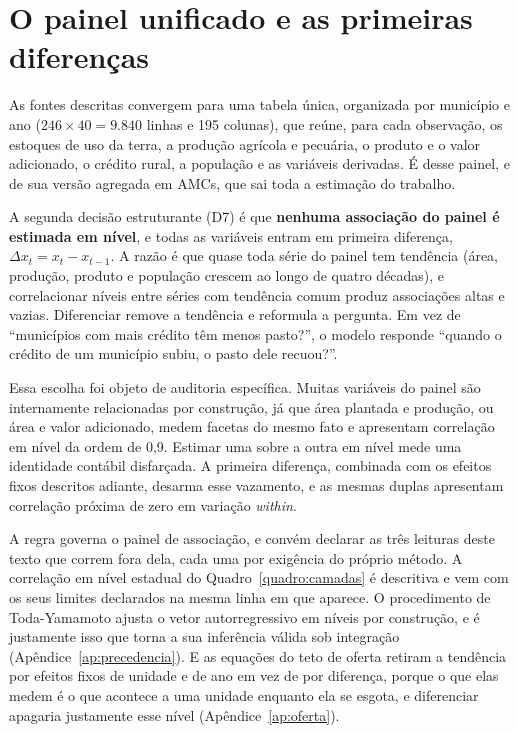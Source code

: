 \section{O painel unificado e as primeiras diferenças}
\label{sec:met-painel}

As fontes descritas convergem para uma tabela única, organizada por
município e ano ($246 \times 40 = 9.840$ linhas e 195 colunas), que
reúne, para cada observação, os estoques de uso da terra, a produção
agrícola e pecuária, o produto e o valor adicionado, o crédito rural, a
população e as variáveis derivadas. É desse painel, e de sua versão agregada
em AMCs, que sai toda a estimação do trabalho.

A segunda decisão estruturante (D7) é que \textbf{nenhuma associação do
painel é estimada em nível}, e todas as variáveis entram em primeira
diferença, $\Delta x_t = x_t - x_{t-1}$. A razão é que quase toda série do painel tem
tendência (área, produção, produto e população crescem ao longo de quatro
décadas), e correlacionar níveis entre séries com tendência comum produz
associações altas e vazias. Diferenciar remove a tendência e reformula a
pergunta. Em vez de ``municípios com mais crédito têm menos pasto?'', o
modelo responde ``quando o crédito de um município subiu, o pasto dele
recuou?''.

Essa escolha foi objeto de auditoria específica. Muitas variáveis do painel
são internamente relacionadas por construção, já que área plantada e produção, ou
área e valor adicionado, medem facetas do mesmo fato e apresentam correlação
em nível da ordem de 0,9. Estimar uma sobre a outra em nível mede uma
identidade contábil disfarçada. A primeira diferença, combinada com os efeitos
fixos descritos adiante, desarma esse vazamento, e as mesmas duplas apresentam
correlação próxima de zero em variação \emph{within}.

A regra governa o painel de associação, e convém declarar as três leituras
deste texto que correm fora dela, cada uma por exigência do próprio método. A
correlação em nível estadual do Quadro~\ref{quadro:camadas} é descritiva e vem
com os seus limites declarados na mesma linha em que aparece. O procedimento
de Toda-Yamamoto ajusta o vetor autorregressivo em níveis por construção, e é
justamente isso que torna a sua inferência válida sob integração
(Apêndice~\ref{ap:precedencia}). E as equações do teto de oferta retiram a
tendência por efeitos fixos de unidade e de ano em vez de por diferença,
porque o que elas medem é o que acontece a uma unidade enquanto ela se
esgota, e diferenciar apagaria justamente esse nível (Apêndice~\ref{ap:oferta}).

